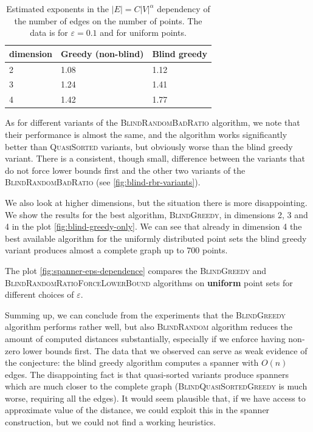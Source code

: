 \documentclass[a4paper,USenglish]{socg-lipics-v2018}
\newcommand{\eps}{\varepsilon}
\begin{document}
\begin{table}[]
\label{tbl:regr_coeff_spanner}
\begin{tabular}{|l|l|l|}
\hline
dimension & \textbf{Greedy (non-blind)} & \textbf{Blind greedy} \\ \hline
2         &         1.08                &  1.12                 \\ \hline
3         &         1.24                &  1.41                \\ \hline
4         &         1.42                &  1.77                 \\ \hline
\end{tabular}
\caption{Estimated exponents in the $|E|= C |V|^\alpha$ dependency of the number of edges
on the number of points. The data is for $\eps = 0.1$ and for uniform points.}
\end{table}


As for different variants of the \textsc{BlindRandomBadRatio} algorithm,
we note that their performance is almost the same, and the algorithm works
significantly better than \textsc{QuasiSorted} variants, but obviously
worse than the blind greedy variant. There is a consistent, though small,
difference between the variants that do not force lower bounds first and
the other two variants of the \textsc{BlindRandomBadRatio} (see \ref{fig:blind-rbr-variants}).


We also look at higher dimensions, but the situation there is more
disappointing. We show the results for the best algorithm, \textsc{BlindGreedy},
in dimensions 2, 3 and 4 in the plot \ref{fig:blind-greedy-only}.
We can see that already in dimension 4 the best available algorithm
for the uniformly distributed point sets the blind greedy variant
produces almost a complete graph up to 700 points.  


The plot \ref{fig:spanner-eps-dependence}
compares the \textsc{BlindGreedy} and \textsc{BlindRandomRatioForceLowerBound} algorithms
on \textbf{uniform} point sets for different choices of $\eps$.

Summing up, we can conclude from the experiments that 
 the \textsc{BlindGreedy} algorithm performs rather well, but also \textsc{BlindRandom}
algorithm reduces the amount of computed distances substantially, especially if we enforce having non-zero lower bounds
first. The data that we observed can serve as weak evidence
of the conjecture: the blind greedy algorithm computes
a spanner with $O(n)$ edges. The disappointing fact is that quasi-sorted variants produce spanners which are much closer to the complete graph
(\textsc{BlindQuasiSortedGreedy} is much worse, requiring all the edges). It would seem plausible that, if we have
access to approximate value of the distance, we could exploit this in the spanner construction, but we could not
find a working heuristics.
\end{document}
